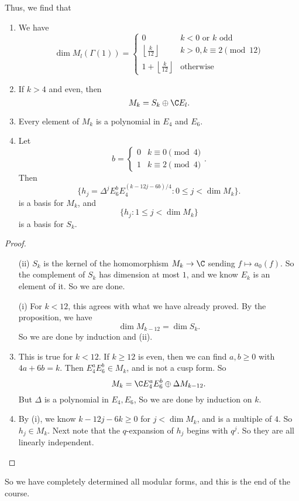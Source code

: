 \documentclass[a4paper]{article}
\begin{document}
Thus, we find that
\begin{thm}\leavevmode
  \begin{enumerate}
    \item We have
      \[
        \dim M_l (\Gamma(1)) =
        \begin{cases}
          0 & k < 0\text{ or }k \text{ odd }\\
          \left\lfloor \frac{k}{12}\right\rfloor & k > 0, k \equiv 2 \pmod{12}\\
          1 + \left\lfloor \frac{k}{12}\right\rfloor & \text{otherwise}
        \end{cases}
      \]
    \item If $k > 4$ and even, then
      \[
        M_k = S_k \oplus \C E_l.
      \]
    \item Every element of $M_k$ is a polynomial in $E_4$ and $E_6$.
    \item Let
      \[
        b =
        \begin{cases}
          0 & k\equiv 0 \pmod 4\\
          1 & k\equiv 2 \pmod 4
        \end{cases}.
      \]
      Then
      \[
        \{h_j = \Delta^j E_6^b E_4^{(k - 12j - 6b)/4} : 0 \leq j < \dim M_k\}.
      \]
      is a basis for $M_k$, and
      \[
        \{h_j : 1 \leq j < \dim M_k\}
      \]
      is a basis for $S_k$.
  \end{enumerate}
\end{thm}
\begin{proof}\leavevmode
  \begin{enumerate}
    \item[(ii)] $S_k$ is the kernel of the homomorphism $M_k \to \C$ sending $f \mapsto a_0(f)$. So the complement of $S_k$ has dimension at most $1$, and we know $E_k$ is an element of it. So we are done.
    \item[(i)] For $k < 12$, this agrees with what we have already proved. By the proposition, we have
      \[
        \dim M_{k - 12} = \dim S_k.
      \]
      So we are done by induction and (ii).
    \item This is true for $k < 12$. If $k \geq 12$ is even, then we can find $a, b \geq 0$ with $4a + 6b = k$. Then $E_4^a E_6^b \in M_k$, and is not a cusp form. So
      \[
        M_k = \C E_4^a E_6^b \oplus \Delta M_{k - 12}.
      \]
      But $\Delta$ is a polynomial in $E_4, E_6$, So we are done by induction on $k$.
    \item By (i), we know $k - 12j - 6k \geq 0$ for $j < \dim M_k$, and is a multiple of $4$. So $h_j \in M_k$. Next note that the $q$-expansion of $h_j$ begins with $q^j$. So they are all linearly independent.\qedhere
  \end{enumerate}
\end{proof}
So we have completely determined all modular forms, and this is the end of the course.
\end{document}

